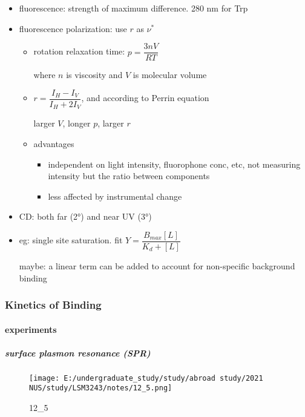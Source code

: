 \documentclass[]{article}
\let\oldparagraph\paragraph
\renewcommand{\paragraph}[1]{\oldparagraph{#1}\mbox{}}
\let\oldsubparagraph\subparagraph
\renewcommand{\subparagraph}[1]{\oldsubparagraph{#1}\mbox{}}
\begin{document}
\begin{itemize}
\item
  fluorescence: strength of maximum difference. 280 nm for Trp
\item
  fluorescence polarization: use \(r\) as \(\nu^*\)

  \begin{itemize}
  \item
    rotation relaxation time: \(p=\dfrac{3nV}{RT}\)

    where \(n\) is viscosity and \(V\) is molecular volume
  \item
    \(r=\dfrac{I_H-I_V}{I_H+2I_V}\), and according to Perrin equation

    larger \(V\), longer \(p\), larger \(r\)
  \item
    advantages

    \begin{itemize}
    \item
      independent on light intensity, fluorophone conc, etc, not
      measuring intensity but the ratio between components
    \item
      less affected by instrumental change
    \end{itemize}
  \end{itemize}
\item
  CD: both far (2°) and near UV (3°)
\item
  eg: single site saturation. fit \(Y=\dfrac{B_{max}[L]}{K_d+[L]}\)

  maybe: a linear term can be added to account for non-specific
  background binding
\end{itemize}

\hypertarget{kinetics-of-binding}{%
\subsubsection{Kinetics of Binding}\label{kinetics-of-binding}}

\hypertarget{experiments}{%
\paragraph{experiments}\label{experiments}}

\hypertarget{surface-plasmon-resonance-spr}{%
\subparagraph{surface plasmon resonance
(SPR)}\label{surface-plasmon-resonance-spr}}

\begin{figure}
\centering
\texttt{[image: E:/undergraduate\_study/study/abroad study/2021 NUS/study/LSM3243/notes/12\_5.png]}
\caption{12\_5}
\end{figure}
\end{document}
